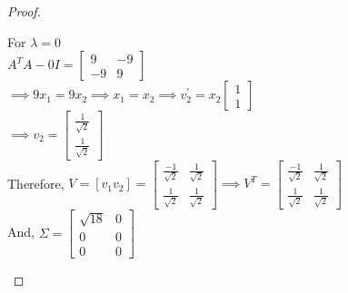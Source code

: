 \documentclass[12pt]{article}
\begin{document}
\begin{proof}
\begin{enumerate}[label=(\alph*)]
For $\lambda = 0$ \\
$A^TA - 0I = \begin{bmatrix}
    9 & -9 \\ 
    -9 & 9
\end{bmatrix} $\\

$\implies 9x_1 = 9x_2 \implies x_1 = x_2 \implies v_2^{'} = x_2 \begin{bmatrix}
1 \\ 1
\end{bmatrix}$ \\

$\implies v_2 = \begin{bmatrix}
\frac{1}{\sqrt{2}} \\ \frac{1}{\sqrt{2}} \end{bmatrix} $ \\

Therefore,
$ V = [v_1 v_2] = \begin{bmatrix}
    \frac{-1}{\sqrt{2}} & \frac{1}{\sqrt{2}} \\ 
    \frac{1}{\sqrt{2}} & \frac{1}{\sqrt{2}} 
\end{bmatrix} \implies V^T = \begin{bmatrix}
    \frac{-1}{\sqrt{2}} & \frac{1}{\sqrt{2}} \\ 
    \frac{1}{\sqrt{2}} & \frac{1}{\sqrt{2}} 
\end{bmatrix} $ \\

And, $\Sigma = \begin{bmatrix}
    \sqrt{18} & 0 \\ 0 & 0 \\ 0 & 0
\end{bmatrix}$ \\


\end{enumerate}
\end{proof}
\end{document}

